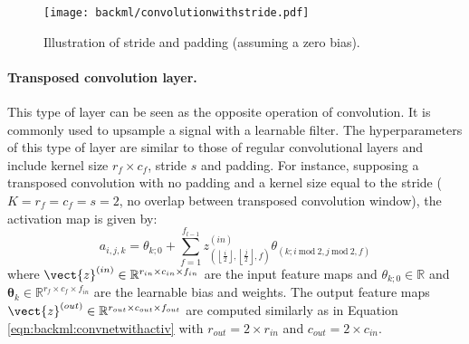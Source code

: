 \begin{figure}
  \centering
  \texttt{[image: backml/convolutionwithstride.pdf]}
  \caption{Illustration of stride and padding (assuming a zero bias).}
  \label{fig:backml:paddingstride}
\end{figure}

\paragraph{Transposed convolution layer.} This type of layer can be seen as the opposite 
operation of convolution. It is commonly used to upsample a signal with a learnable filter. 
The hyperparameters of this type 
of layer are similar to those of regular convolutional layers and include kernel size 
$r_f \times c_f$, stride $s$ and padding. For instance, supposing a transposed 
convolution with no padding and a kernel size equal to the stride ($K = r_f = c_f = s = 2$, 
\ie no overlap between transposed convolution window), the activation map 
is given by:
\begin{equation}
  \label{eqn:backml:transposed_convolution}
  a_{i,j,k} = \theta_{k;0} + \sum_{f=1}^{f_{l-1}} z^{(in)}_{\left(\left\lfloor\frac{i}{2}\right\rfloor, \left\lfloor\frac{j}{2}\right\rfloor, f\right)} \theta_{(k; i~\text{mod}~2,j~\text{mod}~2,f)}
\end{equation}
where $\vect{z}^{(in)} \in \mathbb{R}^{r_{in} \times c_{in} \times f_{in}}$ are the input feature maps and $\theta_{k;0} \in \mathbb{R}$ and $\pmb{\theta}_k \in \mathbb{R}^{r_f \times c_f \times f_{in}}$ are the learnable bias and weights. The output feature maps $\vect{z}^{(out)} \in \mathbb{R}^{r_{out} \times c_{out} \times f_{out}}$ are computed similarly as in Equation \ref{eqn:backml:convnetwithactiv} with $r_{out} = 2 \times r_{in}$ and $c_{out} = 2 \times c_{in}$. 

